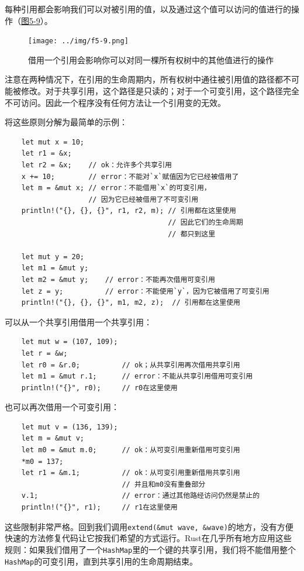 每种引用都会影响我们可以对被引用的值，以及通过这个值可以访问的值进行的操作（\hyperref[f5-9]{图5-9}）。

\begin{figure}[htbp]
    \centering
    \texttt{[image: ../img/f5-9.png]}
    \caption{借用一个引用会影响你可以对同一棵所有权树中的其他值进行的操作}
    \label{f5-9}
\end{figure}

注意在两种情况下，在引用的生命周期内，所有权树中通往被引用值的路径都不可能被修改。对于共享引用，这个路径是只读的；对于一个可变引用，这个路径完全不可访问。因此一个程序没有任何方法让一个引用变的无效。

将这些原则分解为最简单的示例：
\begin{verbatim}
    let mut x = 10;
    let r1 = &x;
    let r2 = &x;    // ok：允许多个共享引用
    x += 10;        // error：不能对`x`赋值因为它已经被借用了
    let m = &mut x; // error：不能借用`x`的可变引用，
                    // 因为它已经被借用了不可变引用
    println!("{}, {}, {}", r1, r2, m); // 引用都在这里使用
                                       // 因此它们的生命周期
                                       // 都只到这里

    let mut y = 20;
    let m1 = &mut y;
    let m2 = &mut y;    // error：不能再次借用可变引用
    let z = y;          // error：不能使用`y`，因为它被借用了可变引用
    println!("{}, {}, {}", m1, m2, z);  // 引用都在这里使用
\end{verbatim}

可以从一个共享引用借用一个共享引用：
\begin{verbatim}
    let mut w = (107, 109);
    let r = &w;
    let r0 = &r.0;          // ok；从共享引用再次借用共享引用
    let m1 = &mut r.1;      // error：不能从共享引用借用可变引用
    println!("{}", r0);     // r0在这里使用
\end{verbatim}

也可以再次借用一个可变引用：
\begin{verbatim}
    let mut v = (136, 139);
    let m = &mut v;
    let m0 = &mut m.0;      // ok：从可变引用重新借用可变引用
    *m0 = 137;
    let r1 = &m.1;          // ok：从可变引用重新借用共享引用
                            // 并且和m0没有重叠部分
    v.1;                    // error：通过其他路经访问仍然是禁止的
    println!("{}", r1);     // r1在这里使用
\end{verbatim}

这些限制非常严格。回到我们调用\texttt{extend(\&mut wave, \&wave)}的地方，没有方便快速的方法修复代码让它按我们希望的方式运行。Rust在几乎所有地方应用这些规则：如果我们借用了一个\texttt{HashMap}里的一个键的共享引用，我们将不能借用整个\texttt{HashMap}的可变引用，直到共享引用的生命周期结束。

